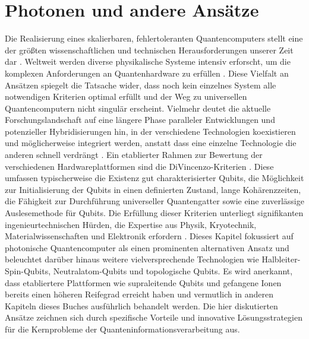 
\section{Photonen und andere Ansätze}
Die Realisierung eines skalierbaren, fehlertoleranten Quantencomputers stellt eine der größten wissenschaftlichen und technischen Herausforderungen unserer Zeit dar \cite{QuantumHardwareExplained}. Weltweit werden diverse physikalische Systeme intensiv erforscht, um die komplexen Anforderungen an Quantenhardware zu erfüllen \cite{chengNoisyIntermediatescaleQuantum2023}. Diese Vielfalt an Ansätzen spiegelt die Tatsache wider, dass noch kein einzelnes System alle notwendigen Kriterien optimal erfüllt und der Weg zu universellen Quantencomputern nicht singulär erscheint. Vielmehr deutet die aktuelle Forschungslandschaft auf eine längere Phase paralleler Entwicklungen und potenzieller Hybridisierungen hin, in der verschiedene Technologien koexistieren und möglicherweise integriert werden, anstatt dass eine einzelne Technologie die anderen schnell verdrängt \cite{QuantumHardwareExplained}.
\newline \newline
Ein etablierter Rahmen zur Bewertung der verschiedenen Hardwareplattformen sind die DiVincenzo-Kriterien \cite{QuantumComputingArchitecture}. Diese umfassen typischerweise die Existenz gut charakterisierter Qubits, die Möglichkeit zur Initialisierung der Qubits in einen definierten Zustand, lange Kohärenzzeiten, die Fähigkeit zur Durchführung universeller Quantengatter sowie eine zuverlässige Auslesemethode für Qubits. Die Erfüllung dieser Kriterien unterliegt signifikanten ingenieurtechnischen Hürden, die Expertise aus Physik, Kryotechnik, Materialwissenschaften und Elektronik erfordern \cite{QuantumHardwareExplained}.
\newline \newline
Dieses Kapitel fokussiert auf photonische Quantencomputer als einen prominenten alternativen Ansatz und beleuchtet darüber hinaus weitere vielversprechende Technologien wie Halbleiter-Spin-Qubits, Neutralatom-Qubits und topologische Qubits. Es wird anerkannt, dass etabliertere Plattformen wie supraleitende Qubits \cite{QuantumComputingArchitecture} und gefangene Ionen \cite{sruthisomarouthuQuantumComputingDigital2025} bereits einen höheren Reifegrad erreicht haben und vermutlich in anderen Kapiteln dieses Buches ausführlich behandelt werden. Die hier diskutierten Ansätze zeichnen sich durch spezifische Vorteile und innovative Lösungsstrategien für die Kernprobleme der Quanteninformationsverarbeitung aus.
